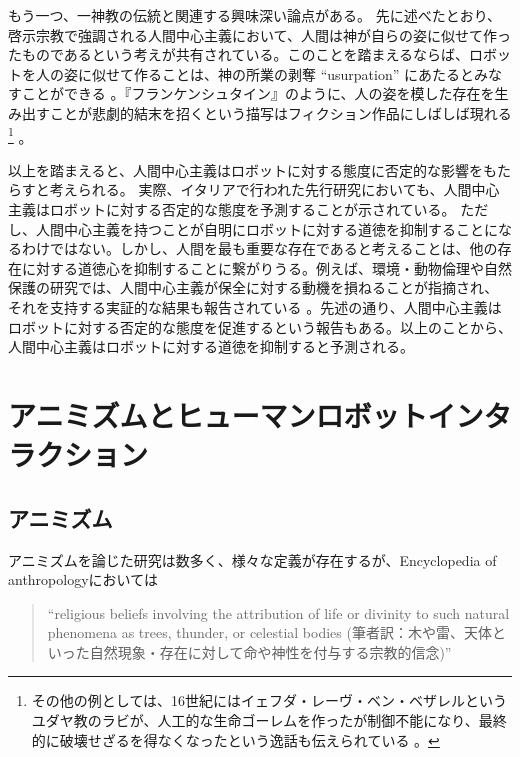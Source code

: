 \documentclass[a4j,12pt]{jreport}
\begin{document}
もう一つ、一神教の伝統と関連する興味深い論点がある。
先に述べたとおり、啓示宗教で強調される人間中心主義において、人間は神が自らの姿に似せて作ったものであるという考えが共有されている。このことを踏まえるならば、ロボットを人の姿に似せて作ることは、神の所業の剥奪 ``usurpation'' にあたるとみなすことができる\cite{usurp} 。『フランケンシュタイン』のように、人の姿を模した存在を生み出すことが悲劇的結末を招くという描写はフィクション作品にしばしば現れる\footnote{その他の例としては、16世紀にはイェフダ・レーヴ・ベン・ベザレルというユダヤ教のラビが、人工的な生命ゴーレムを作ったが制御不能になり、最終的に破壊せざるを得なくなったという逸話も伝えられている\cite{usurp} 。} 。


以上を踏まえると、人間中心主義はロボットに対する態度に否定的な影響をもたらすと考えられる。
実際、イタリアで行われた先行研究\cite{fortu}においても、人間中心主義はロボットに対する否定的な態度を予測することが示されている。
ただし、人間中心主義を持つことが自明にロボットに対する道徳を抑制することになるわけではない。しかし、人間を最も重要な存在であると考えることは、他の存在に対する道徳心を抑制することに繋がりうる。例えば、環境・動物倫理や自然保護の研究では、人間中心主義が保全に対する動機を損ねることが指摘され\cite{ecocen}、それを支持する実証的な結果も報告されている\cite{fortu} 。先述の通り、人間中心主義はロボットに対する否定的な態度を促進するという報告もある。以上のことから、人間中心主義はロボットに対する道徳を抑制すると予測される。



\section{アニミズムとヒューマンロボットインタラクション}
\subsection{アニミズム}
アニミズムを論じた研究は数多く、様々な定義が存在するが、Encyclopedia of anthropology\cite{ency}においては
\begin{quote}
“religious beliefs involving the attribution of life or divinity to such natural phenomena as trees, thunder, or celestial bodies (筆者訳：木や雷、天体といった自然現象・存在に対して命や神性を付与する宗教的信念)”
\end{quote}
\end{document}
